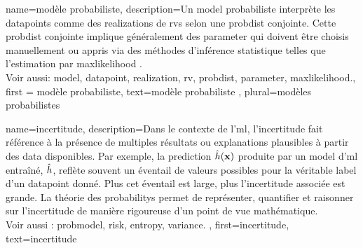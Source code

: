 
{
	name={modèle probabiliste},
	description={Un \gls{model} probabiliste interprète les \glspl{datapoint} 
		comme des \glspl{realization} de \glspl{rv} selon une \gls{probdist} conjointe. Cette \gls{probdist} conjointe implique généralement des \gls{parameter} qui doivent être choisis manuellement ou appris via des méthodes d’inférence statistique telles que l’estimation par \gls{maxlikelihood} \cite{LC}.
		\\ 
		Voir aussi: \gls{model}, \gls{datapoint}, \gls{realization}, \gls{rv}, \gls{probdist}, \gls{parameter}, \gls{maxlikelihood}.}, 
	first = {modèle probabiliste}, text={modèle probabiliste} , plural={modèles probabilistes}
}

{name={incertitude},
	description={Dans le contexte de l’\gls{ml}, l’incertitude fait référence à la présence de multiples 
		résultats ou \glspl{explanation} plausibles à partir des \gls{data} disponibles. Par exemple, la 
		\gls{prediction} $\hat{h}({\bf x})$ produite par un \gls{model} d’\gls{ml} entraîné, $\hat{h}$,
		reflète souvent un éventail de valeurs possibles pour la véritable \gls{label} d’un \gls{datapoint} donné. 
		Plus cet éventail est large, plus l’incertitude associée est grande. La théorie des \glspl{probability} 
		permet de représenter, quantifier et raisonner sur l’incertitude de manière 
		rigoureuse d'un point de vue mathématique.
		\\ 
		Voir aussi : \gls{probmodel}, \gls{risk}, \gls{entropy}, \gls{variance}. },
	first={incertitude},
	text={incertitude}
}

